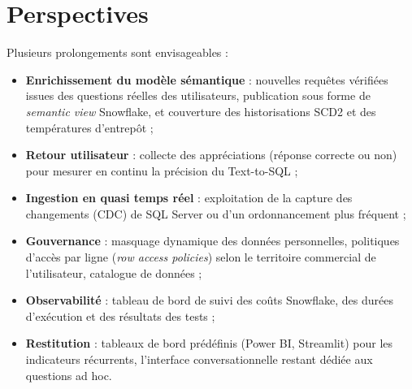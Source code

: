 \section*{Perspectives}

Plusieurs prolongements sont envisageables :
\begin{itemize}
  \item \textbf{Enrichissement du modèle sémantique} : nouvelles requêtes vérifiées issues des questions
        réelles des utilisateurs, publication sous forme de \emph{semantic view} Snowflake, et
        couverture des historisations SCD2 et des températures d'entrepôt ;
  \item \textbf{Retour utilisateur} : collecte des appréciations (réponse correcte ou non) pour mesurer
        en continu la précision du Text-to-SQL ;
  \item \textbf{Ingestion en quasi temps réel} : exploitation de la capture des changements (CDC) de
        SQL Server ou d'un ordonnancement plus fréquent ;
  \item \textbf{Gouvernance} : masquage dynamique des données personnelles, politiques d'accès par ligne
        (\emph{row access policies}) selon le territoire commercial de l'utilisateur, catalogue de
        données ;
  \item \textbf{Observabilité} : tableau de bord de suivi des coûts Snowflake, des durées d'exécution et
        des résultats des tests ;
  \item \textbf{Restitution} : tableaux de bord prédéfinis (Power BI, Streamlit) pour les indicateurs
        récurrents, l'interface conversationnelle restant dédiée aux questions ad hoc.
\end{itemize}
